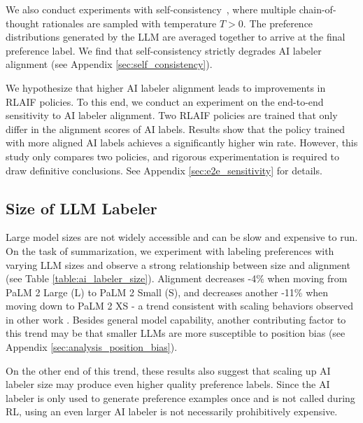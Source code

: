 \documentclass[11pt]{article}
\begin{document}
We also conduct experiments with self-consistency~\citep{wang2022self}, where multiple chain-of-thought rationales are sampled with temperature $T > 0$. The preference distributions generated by the LLM are averaged together to arrive at the final preference label. We find that self-consistency strictly degrades AI labeler alignment (see Appendix \ref{sec:self_consistency}).

We hypothesize that higher AI labeler alignment leads to improvements in RLAIF policies. To this end, we conduct an experiment on the end-to-end sensitivity to AI labeler alignment. Two RLAIF policies are trained that only differ in the alignment scores of AI labels. Results show that the policy trained with more aligned AI labels achieves a significantly higher win rate. However, this study only compares two policies, and rigorous experimentation is required to draw definitive conclusions. See Appendix \ref{sec:e2e_sensitivity} for details.

\subsection{Size of LLM Labeler}
\label{sec:size_of_llm}

Large model sizes are not widely accessible and can be slow and expensive to run. On the task of summarization, we experiment with labeling preferences with varying LLM sizes and observe a strong relationship between size and alignment (see Table \ref{table:ai_labeler_size}). Alignment decreases -4\% when moving from PaLM 2 Large (L) to PaLM 2 Small (S), and decreases another -11\% when moving down to PaLM 2 XS - a trend consistent with scaling behaviors observed in other work \citep{kaplan2020scaling}. Besides general model capability, another contributing factor to this trend may be that smaller LLMs are more susceptible to position bias (see Appendix \ref{sec:analysis_position_bias}).

On the other end of this trend, these results also suggest that scaling up AI labeler size may produce even higher quality preference labels. Since the AI labeler is only used to generate preference examples once and is not called during RL, using an even larger AI labeler is not necessarily prohibitively expensive.

\begin{table}[h]
\centering
\setlength{\tabcolsep}{1pt}
\caption{AI labeler alignment increases as the size of the LLM labeler increases.}
\label{table:ai_labeler_size}
\end{table}
\end{document}
